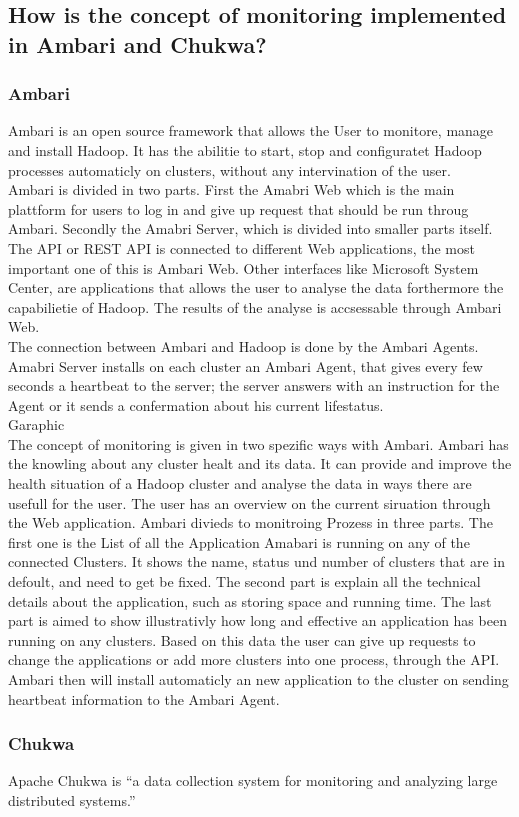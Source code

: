 \subsection{How is the concept of monitoring implemented in Ambari and Chukwa?}
\label{subsec:Implementation}

\subsubsection{Ambari}
Ambari is an open source framework that allows the User to monitore, manage and install Hadoop. It has the abilitie to start, stop and configuratet Hadoop processes automaticly on clusters, without any intervination of the user.
\\
Ambari is divided in two parts. First the Amabri Web which is the main plattform for users to log in and give up request that should be run throug Ambari. Secondly the Amabri Server, which is divided into smaller parts itself. The API or REST API is connected to different Web applications, the most important one of this is Ambari Web. Other interfaces like Microsoft System Center, are applications that allows the user to analyse the data forthermore the capabilietie of Hadoop. The results of the analyse is accsessable through Ambari Web.
\\
The connection between Ambari and Hadoop is done by the Ambari Agents. Amabri Server installs on each cluster an Ambari Agent, that gives every few seconds a heartbeat to the server; the server answers with an instruction for the Agent or it sends a confermation about his current lifestatus. 
\\
Garaphic 
\\ 
The concept of monitoring is given in two spezific ways with Ambari. Ambari has the knowling about any cluster healt and its data. It can provide and improve the health situation of a Hadoop cluster and analyse the data in ways there are usefull for the user. The user has an overview on the current siruation through the Web application. Ambari divieds to monitroing Prozess in three parts. The first one is the List of all the Application Amabari is running on any of the connected Clusters. It shows the name, status und number of clusters that are in defoult, and need to get be fixed. The second part is explain all the technical details about the application, such as storing space and running time. The last part is aimed to show illustrativly how long and effective an application has been running on any clusters. Based on this data the user can give up requests to change the applications or add more clusters into one process, through the API. Ambari then will install automaticly an new application to the cluster on sending heartbeat information to the Ambari Agent. 

\subsubsection{Chukwa}
Apache Chukwa is ``a data collection system for monitoring and analyzing large distributed systems.''~\cite{Boulona}
